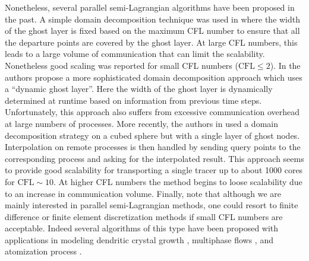 Nonetheless, several parallel semi-Lagrangian algorithms have been proposed in the past. A simple domain decomposition technique was used in \cite{Thomas;Cote:95:Massively-parallel-s} where the width of the ghost layer is fixed based on the maximum CFL number to ensure that all the departure points are covered by the ghost layer. At large CFL numbers, this leads to a large volume of communication that can limit the scalability. Nonetheless good scaling was reported for small CFL numbers ($\text{CFL} \le 2$). In \cite{Drake;Foster;Michalakes;etal:95:Design-and-performan} the authors propose a more sophisticated domain decomposition approach which uses a ``dynamic ghost layer''. Here the width of the ghost layer is dynamically determined at runtime based on information from previous time steps. Unfortunately, this approach also suffers from excessive communication overhead at large numbers of processes. More recently, the authors in \cite{White-III;Dongarra:11:High-performance-hig} used a domain decomposition strategy on a cubed sphere but with a single layer of ghost nodes. Interpolation on remote processes is then handled by sending query points to the corresponding process and asking for the interpolated result. This approach seems to provide good scalability for transporting a single tracer up to about 1000 cores for $\text{CFL} \sim 10$. At higher CFL numbers the method begins to loose scalability due to an increase in communication volume. Finally, note that although we are mainly interested in parallel semi-Lagrangian methods, one could resort to finite difference or finite element discretization methods if small CFL numbers are acceptable. Indeed several algorithms of this type have been proposed with applications in modeling dendritic crystal growth \cite{Wang;Chang;Kale;etal:06:Parallelization-of-a}, multiphase flows \cite{Sussman:05:A-parallelized-adapt, Fortmeier;Bucker:11:A-parallel-strategy-, Rodriguez;Sahni;Lahey-Jr;etal:13:A-parallel-adaptive-}, and atomization process \cite{Herrmann:10:A-parallel-Eulerian-}.


